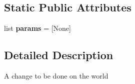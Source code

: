 \subsection*{\-Static \-Public \-Attributes}
\begin{DoxyCompactItemize}
\item 
\hypertarget{classorders_1_1_order_a8c362161ec6b78b5a5a04cf63ba79a0d}{list {\bfseries params} = \mbox{[}\-None\mbox{]}}\label{classorders_1_1_order_a8c362161ec6b78b5a5a04cf63ba79a0d}

\end{DoxyCompactItemize}


\subsection{\-Detailed \-Description}
\begin{DoxyVerb}A change to be done on the world\end{DoxyVerb}
 

